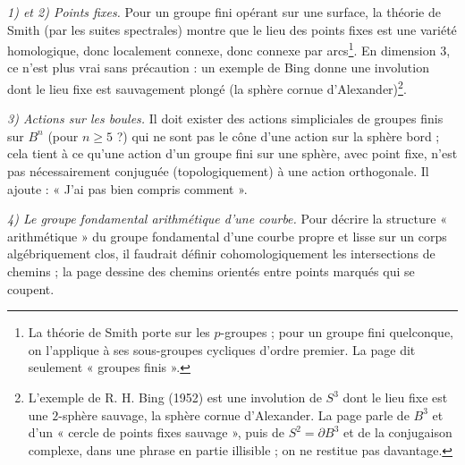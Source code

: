 \documentclass[11pt,a4paper]{article}
\begin{document}
\emph{1) et 2) Points fixes.} Pour un groupe fini opérant sur une surface, la
théorie de Smith (par les suites spectrales) montre que le lieu des points
fixes est une variété homologique, donc localement connexe, donc connexe par
arcs\footnote{La théorie de Smith porte sur les $p$-groupes ; pour un groupe
fini quelconque, on l'applique à ses sous-groupes cycliques d'ordre premier.
La page dit seulement « groupes finis ».}. En dimension $3$, ce n'est plus
vrai sans précaution : un exemple de Bing donne une involution dont le lieu
fixe est sauvagement plongé (la sphère cornue d'Alexander)\footnote{L'exemple
de R. H. Bing (1952) est une involution de $S^3$ dont le lieu fixe est une
$2$-sphère sauvage, la sphère cornue d'Alexander. La page parle de $B^3$ et
d'un « cercle de points fixes sauvage », puis de $S^2 = \partial B^3$ et de la
conjugaison complexe, dans une phrase en partie illisible ; on ne restitue pas
davantage.}.

\emph{3) Actions sur les boules.} Il doit exister des actions simpliciales de
groupes finis sur $B^n$ (pour $n \geq 5$ ?) qui ne sont pas le cône d'une
action sur la sphère bord ; cela tient à ce qu'une action d'un groupe fini sur
une sphère, avec point fixe, n'est pas nécessairement conjuguée
(topologiquement) à une action orthogonale. Il ajoute : « J'ai pas bien compris
comment ».

\emph{4) Le groupe fondamental arithmétique d'une courbe.} Pour décrire la
structure « arithmétique » du groupe fondamental d'une courbe propre et lisse
sur un corps algébriquement clos, il faudrait définir cohomologiquement les
intersections de chemins ; la page dessine des chemins orientés entre points
marqués qui se coupent.
\end{document}
